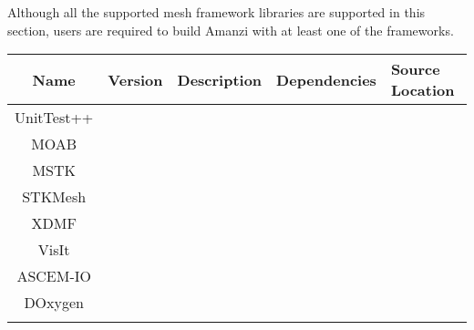 \documentclass[12pt]{article}
\begin{document}
Although all the supported mesh framework libraries are supported in this section, users are required to build
Amanzi with at least one of the frameworks. 

\begin{table}[htdp]
\begin{center}
\begin{tabular}{|c|c|p{3cm}|p{3cm}|p{3cm}|}
\hline
\hline
Name & Version & Description & Dependencies & Source Location \\
\hline
UnitTest++ &&&& \\
\hline
MOAB &&&& \\
\hline
MSTK &&&& \\
\hline
STKMesh &&&& \\
\hline
XDMF &&&& \\
\hline
VisIt &&&& \\
\hline
ASCEM-IO &&&& \\
\hline
DOxygen &&&& \\

&&&& \\
\hline


\end{tabular}
\end{center}
\label{default}
\end{table}%
\end{document}
